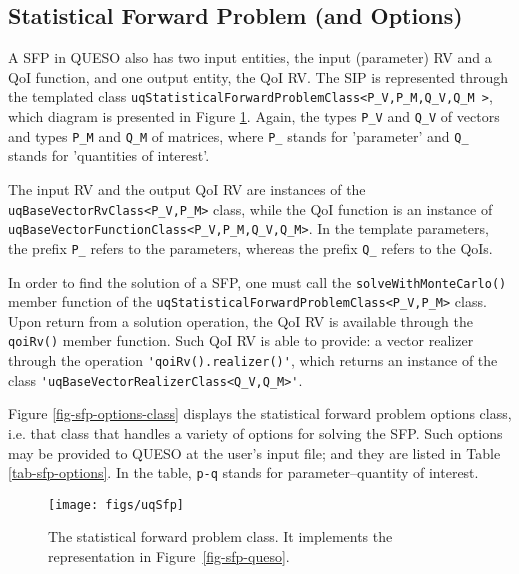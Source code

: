 \subsection{Statistical Forward Problem (and Options)}

A SFP in QUESO also has two input entities, the input (parameter) RV and a QoI function, and one output entity, the QoI RV. 
The SIP is represented through the templated class \verb+uqStatisticalForwardProblemClass<P_V,P_M,Q_V,Q_M >+, which diagram is presented in Figure \ref{fig-sfp-class}. Again, the types \verb+P_V+ and \verb+Q_V+ of vectors and types \verb+P_M+ and \verb+Q_M+ of matrices, where \verb+P_+ stands for 'parameter' and \verb+Q_+ stands for 'quantities of interest'.

The input RV and the output QoI RV are instances of the \verb+uqBaseVectorRvClass<P_V,P_M>+ class, while
the QoI function is an instance of \verb+uqBaseVectorFunctionClass<P_V,P_M,Q_V,Q_M>+.
In the template parameters, the prefix \verb+P_+ refers to the parameters, whereas the prefix \verb+Q_+ refers to the QoIs.

In order to find the solution of a SFP, one must call the \verb+solveWithMonteCarlo()+ member function of the \verb+uqStatisticalForwardProblemClass<P_V,P_M>+ class.
Upon return from a solution operation, the QoI RV is available through the \verb+qoiRv()+ member function. Such QoI RV  is able to provide:
a vector realizer through the operation \verb+'qoiRv().realizer()'+, which returns an instance of the class \verb+'uqBaseVectorRealizerClass<Q_V,Q_M>'+.



Figure \ref{fig-sfp-options-class} displays the  statistical forward problem options class, i.e. that class that handles a variety of options for solving the SFP. Such options may be provided to QUESO at the user's input file; and they are listed in Table \ref{tab-sfp-options}. In the table, \texttt{p-q} stands for parameter--quantity of interest. 



 

\begin{figure}[htpb]
\centering
\texttt{[image: figs/uqSfp]}
\vspace*{-18pt}
\caption{The statistical forward problem class. It implements the representation in Figure~\ref{fig-sfp-queso}.}
\label{fig-sfp-class}
\end{figure}

